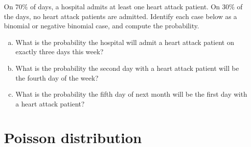 \begin{exercisewrap}
\begin{nexercise}
On 70\% of days, a hospital admits at least one heart attack patient. On 30\% of the days, no heart attack patients are admitted. Identify each case below as a binomial or negative binomial case, and compute the probability.\footnotemark
\begin{enumerate}[(a)]
\item What is the probability the hospital will admit
    a heart attack patient on exactly three days this week?

\item What is the probability the second day with a heart
    attack patient will be the fourth day of the week?

\item What is the probability the fifth day of next month
    will be the first day with a heart attack patient?
\end{enumerate}
\end{nexercise}
\end{exercisewrap}





\section{Poisson distribution}
\label{poisson}


